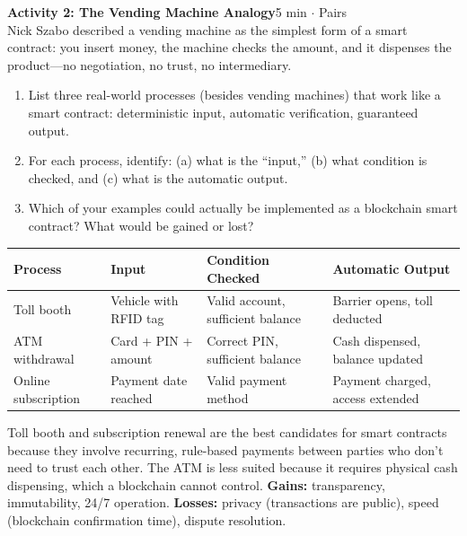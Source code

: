 \documentclass[11pt,a4paper]{article}
\newcommand{\activitybox}[3]{%
  \noindent\colorbox{mllavender4}{\parbox{\dimexpr\linewidth-2\fboxsep}{%
    \textbf{\color{mlpurple}#1}\hfill\textcolor{mlgray}{\small #2}\\[2pt]#3%
  }}\par\vspace{4pt}%
}
\begin{document}
\vspace{2pt}

\activitybox{Activity 2: The Vending Machine Analogy}{5 min $\cdot$ Pairs}{%
Nick Szabo described a vending machine as the simplest form of a smart contract: you insert money, the machine checks the amount, and it dispenses the product---no negotiation, no trust, no intermediary.
\begin{enumerate}
\item List three real-world processes (besides vending machines) that work like a smart contract: deterministic input, automatic verification, guaranteed output.
\item For each process, identify: (a) what is the ``input,'' (b) what condition is checked, and (c) what is the automatic output.
\item Which of your examples could actually be implemented as a blockchain smart contract? What would be gained or lost?
\end{enumerate}
\vspace{4pt}
{\footnotesize\renewcommand{\arraystretch}{1.35}%
\setlength{\tabcolsep}{5pt}%
\begin{tabular}{@{}p{3.2cm}p{3.2cm}p{3.2cm}p{3.4cm}@{}}
\toprule
\textbf{Process} & \textbf{Input} & \textbf{Condition Checked} & \textbf{Automatic Output} \\
\midrule
{\scriptsize Toll booth} & {\scriptsize Vehicle with RFID tag} & {\scriptsize Valid account, sufficient balance} & {\scriptsize Barrier opens, toll deducted} \\
{\scriptsize ATM withdrawal} & {\scriptsize Card + PIN + amount} & {\scriptsize Correct PIN, sufficient balance} & {\scriptsize Cash dispensed, balance updated} \\
{\scriptsize Online subscription} & {\scriptsize Payment date reached} & {\scriptsize Valid payment method} & {\scriptsize Payment charged, access extended} \\
\bottomrule
\end{tabular}}
\vspace{2pt}
}

\begin{answerbox}
\small
Toll booth and subscription renewal are the best candidates for smart contracts because they involve recurring, rule-based payments between parties who don't need to trust each other. The ATM is less suited because it requires physical cash dispensing, which a blockchain cannot control. \textbf{Gains:} transparency, immutability, 24/7 operation. \textbf{Losses:} privacy (transactions are public), speed (blockchain confirmation time), dispute resolution.
\end{answerbox}
\end{document}
